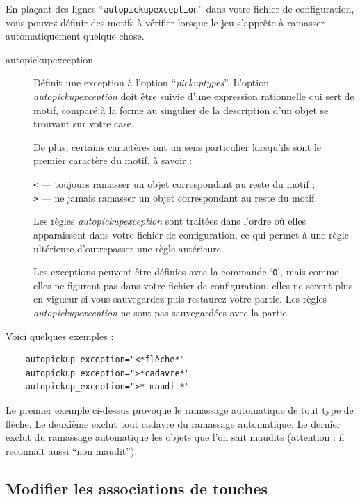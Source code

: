 \documentclass[titlepage]{article}
\begin{document}
En plaçant des lignes ``\texttt{autopickup\textunderscore exception}'' dans votre fichier de
configuration, vous pouvez définir des motifs à vérifier lorsque le jeu
s'apprête à ramasser automatiquement quelque chose.

\begin{description}
\item[autopickup\textunderscore exception]
Définit une exception à l'option ``\textit{pickup\textunderscore types}''.
L'option \textit{autopickup\textunderscore exception} doit être suivie d'une expression
rationnelle qui sert de motif, comparé à la forme au singulier de la
description d'un objet se trouvant sur votre case.

De plus, certains caractères ont un sens particulier lorsqu'ils sont le premier
caractère du motif, à savoir :

\texttt{<} --- toujours ramasser un objet correspondant au reste du motif ;\\
\texttt{>} --- ne jamais ramasser un objet correspondant au reste du motif.

Les règles \textit{autopickup\textunderscore exception} sont traitées dans l'ordre
où elles apparaissent dans votre fichier de configuration, ce qui permet à une
règle ultérieure d'outrepasser une règle antérieure.

Les exceptions peuvent être définies avec la commande `\texttt{O}', mais comme elles ne
figurent pas dans votre fichier de configuration, elles ne seront plus en vigueur
si vous sauvegardez puis restaurez votre partie.
Les règles \textit{autopickup\textunderscore exception} ne sont pas sauvegardées avec la partie.
\end{description}

Voici quelques exemples :
\begin{verbatim}
    autopickup_exception="<*flèche*"
    autopickup_exception=">*cadavre*"
    autopickup_exception=">* maudit*"
\end{verbatim}

Le premier exemple ci-dessus provoque le ramassage automatique de tout type de flèche.
Le deuxième exclut tout cadavre du ramassage automatique.
Le dernier exclut du ramassage automatique les objets que l'on sait maudits
(attention : il reconnaît aussi ``non maudit'').


\subsection*{Modifier les associations de touches}
\end{document}
